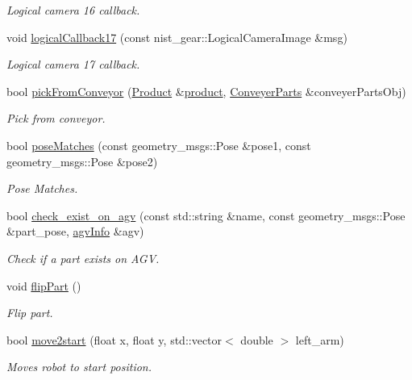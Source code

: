 \begin{DoxyCompactItemize}
\begin{DoxyCompactList}\small\item\em Logical camera 16 callback. \end{DoxyCompactList}\item 
void \hyperlink{classGantryControl_a9d745504ec1dbcc8549f5a604f34bbcc}{logical\+Callback17} (const nist\+\_\+gear\+::\+Logical\+Camera\+Image \&msg)
\begin{DoxyCompactList}\small\item\em Logical camera 17 callback. \end{DoxyCompactList}\item 
bool \hyperlink{classGantryControl_aa12af59b0fda9a1437db989a13036934}{pick\+From\+Conveyor} (\hyperlink{structProduct}{Product} \&\hyperlink{utils_8h_a48a7207852c0455cce7e65703b12ec7e}{product}, \hyperlink{classConveyerParts}{Conveyer\+Parts} \&conveyer\+Parts\+Obj)
\begin{DoxyCompactList}\small\item\em Pick from conveyor. \end{DoxyCompactList}\item 
bool \hyperlink{classGantryControl_a9c655daed586e64921ffc53cb90b2873}{pose\+Matches} (const geometry\+\_\+msgs\+::\+Pose \&pose1, const geometry\+\_\+msgs\+::\+Pose \&pose2)
\begin{DoxyCompactList}\small\item\em Pose Matches. \end{DoxyCompactList}\item 
bool \hyperlink{classGantryControl_a31672ce076ba59662af6c77c82ab136f}{check\+\_\+exist\+\_\+on\+\_\+agv} (const std\+::string \&name, const geometry\+\_\+msgs\+::\+Pose \&part\+\_\+pose, \hyperlink{structagvInfo}{agv\+Info} \&agv)
\begin{DoxyCompactList}\small\item\em Check if a part exists on A\+GV. \end{DoxyCompactList}\item 
void \hyperlink{classGantryControl_a80a0b29105892d6435ef1bb061f35d8f}{flip\+Part} ()
\begin{DoxyCompactList}\small\item\em Flip part. \end{DoxyCompactList}\item 
bool \hyperlink{classGantryControl_adfbb542c0c4b836ec50bc7cf70557220}{move2start} (float x, float y, std\+::vector$<$ double $>$ left\+\_\+arm)
\begin{DoxyCompactList}\small\item\em Moves robot to start position. \end{DoxyCompactList}\item 

\end{DoxyCompactItemize}
